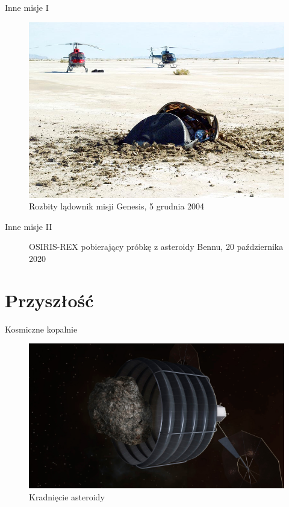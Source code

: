 \documentclass{beamer}
\begin{document}
\begin{frame}{Inne misje I}
    \begin{figure}
        \centering
        \includegraphics[width=0.75\linewidth]{kosmos/genesis.png}
        \caption{Rozbity lądownik misji Genesis, 5 grudnia 2004}
    \end{figure}
\end{frame}

\begin{frame}{Inne misje II}
    \begin{figure}
        \centering
        \caption{OSIRIS-REX pobierający próbkę z asteroidy Bennu, 20 października 2020}
    \end{figure}
\end{frame}

\section{Przyszłość}
\begin{frame}{Kosmiczne kopalnie}
   \begin{figure}
        \centering
        \includegraphics[width=0.75\linewidth]{kosmos/zuodziej.png}
        \caption{Kradnięcie asteroidy}
    \end{figure} 
\end{frame}
\end{document}

